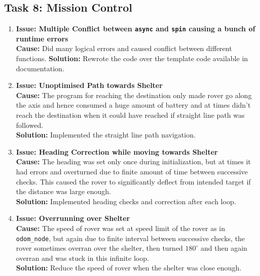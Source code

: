 \documentclass[12pt,a4paper]{article}
\begin{document}
\subsection{Task 8: Mission Control}
\begin{enumerate}[leftmargin=*]
    \item \textbf{Issue: Multiple Conflict between \texttt{async} and \texttt{spin} causing a bunch of runtime errors}\\
    \textbf{Cause:} Did many logical errors and caused conflict between different functions.
    \textbf{Solution:} Rewrote the code over the template code available in documentation.

    \item \textbf{Issue: Unoptimised Path towards Shelter}\\
    \textbf{Cause:} The program for reaching the destination only made rover go along the axis and hence consumed a huge amount of battery and at times didn't reach the destination when it could have reached if straight line path was followed.\\
    \textbf{Solution:} Implemented the straight line path navigation.

    \item \textbf{Issue: Heading Correction while moving towards Shelter}\\
    \textbf{Cause:} The heading was set only once during initialization, but at times it had errors and overturned due to finite amount of time between successive checks. This caused the rover to significantly deflect from intended target if the distance was large enough.\\
    \textbf{Solution:} Implemented heading checks and correction after each loop.

    \item \textbf{Issue: Overrunning over Shelter}\\
    \textbf{Cause:} The speed of rover was set at speed limit of the rover as in \texttt{odom\_node}, but again due to finite interval between successive checks, the rover sometimes overran over the shelter, then turned $180^{\circ}$ and then again overran and was stuck in this infinite loop.\\
    \textbf{Solution:} Reduce the speed of rover when the shelter was close enough.
\end{enumerate}
\end{document}
